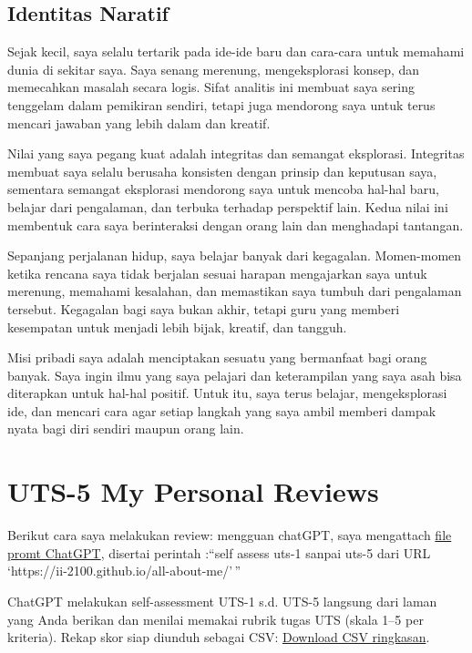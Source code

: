 \documentclass[
  letterpaper,
  DIV=11,
  numbers=noendperiod]{scrreprt}
\begin{document}
\section{Identitas Naratif}\label{identitas-naratif}

Sejak kecil, saya selalu tertarik pada ide-ide baru dan cara-cara untuk
memahami dunia di sekitar saya. Saya senang merenung, mengeksplorasi
konsep, dan memecahkan masalah secara logis. Sifat analitis ini membuat
saya sering tenggelam dalam pemikiran sendiri, tetapi juga mendorong
saya untuk terus mencari jawaban yang lebih dalam dan kreatif.

Nilai yang saya pegang kuat adalah integritas dan semangat eksplorasi.
Integritas membuat saya selalu berusaha konsisten dengan prinsip dan
keputusan saya, sementara semangat eksplorasi mendorong saya untuk
mencoba hal-hal baru, belajar dari pengalaman, dan terbuka terhadap
perspektif lain. Kedua nilai ini membentuk cara saya berinteraksi dengan
orang lain dan menghadapi tantangan.

Sepanjang perjalanan hidup, saya belajar banyak dari kegagalan.
Momen-momen ketika rencana saya tidak berjalan sesuai harapan
mengajarkan saya untuk merenung, memahami kesalahan, dan memastikan saya
tumbuh dari pengalaman tersebut. Kegagalan bagi saya bukan akhir, tetapi
guru yang memberi kesempatan untuk menjadi lebih bijak, kreatif, dan
tangguh.

Misi pribadi saya adalah menciptakan sesuatu yang bermanfaat bagi orang
banyak. Saya ingin ilmu yang saya pelajari dan keterampilan yang saya
asah bisa diterapkan untuk hal-hal positif. Untuk itu, saya terus
belajar, mengeksplorasi ide, dan mencari cara agar setiap langkah yang
saya ambil memberi dampak nyata bagi diri sendiri maupun orang lain.


\chapter{UTS-5 My Personal Reviews}\label{uts-5-my-personal-reviews}

Berikut cara saya melakukan review: mengguan chatGPT, saya mengattach
\href{skor_uts.pdf}{file promt ChatGPT}, disertai perintah :``self
assess uts-1 sanpai uts-5 dari URL
`https://ii-2100.github.io/all-about-me/'\,''

ChatGPT melakukan self-assessment UTS-1 s.d. UTS-5 langsung dari laman
yang Anda berikan dan menilai memakai rubrik tugas UTS (skala 1--5 per
kriteria). Rekap skor siap diunduh sebagai CSV:
\href{sandbox:/mnt/data/UTS_self_assessment.csv}{Download CSV
ringkasan}.
\end{document}
